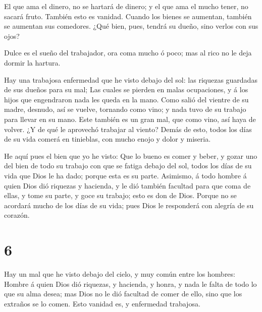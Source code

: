  El que ama el dinero, no se hartará de dinero; y el que
ama el mucho tener, no sacará fruto. También esto es vanidad.
 Cuando los bienes se aumentan, también se aumentan sus
comedores. ¿Qué bien, pues, tendrá su dueño, sino verlos con sus ojos?

 Dulce es el sueño del trabajador, ora coma mucho ó poco;
mas al rico no le deja dormir la hartura.

 Hay una trabajosa enfermedad que he visto debajo del sol:
las riquezas guardadas de sus dueños para su mal;  Las
cuales se pierden en malas ocupaciones, y á los hijos que engendraron
nada les queda en la mano.  Como salió del vientre de su
madre, desnudo, así se vuelve, tornando como vino; y nada tuvo de su
trabajo para llevar en su mano.  Este también es un gran
mal, que como vino, así haya de volver. ¿Y de qué le aprovechó trabajar
al viento?  Demás de esto, todos los días de su vida comerá
en tinieblas, con mucho enojo y dolor y miseria.

 He aquí pues el bien que yo he visto: Que lo bueno es
comer y beber, y gozar uno del bien de todo su trabajo con que se fatiga
debajo del sol, todos los días de su vida que Dios le ha dado; porque
esta es su parte.  Asimismo, á todo hombre á quien Dios dió
riquezas y hacienda, y le dió también facultad para que coma de ellas, y
tome su parte, y goce su trabajo; esto es don de Dios. 
Porque no se acordará mucho de los días de su vida; pues Dios le
responderá con alegría de su corazón.

\hypertarget{section-5}{%
\section{6}\label{section-5}}

 Hay un mal que he visto debajo del cielo, y muy común entre
los hombres:  Hombre á quien Dios dió riquezas, y hacienda,
y honra, y nada le falta de todo lo que su alma desea; mas Dios no le
dió facultad de comer de ello, sino que los extraños se lo comen. Esto
vanidad es, y enfermedad trabajosa.

